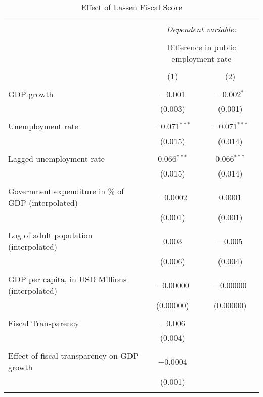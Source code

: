
\begin{table}[!htbp] \centering 
  \caption{Effect of Lassen Fiscal Score} 
  \label{} 
\begin{tabular}{@{\extracolsep{5pt}}lcc} 
\\[-1.8ex]\hline 
\hline \\[-1.8ex] 
 & \multicolumn{2}{c}{\textit{Dependent variable:}} \\ 
\cline{2-3} 
\\[-1.8ex] & \multicolumn{2}{c}{Difference in public employment rate} \\ 
\\[-1.8ex] & (1) & (2)\\ 
\hline \\[-1.8ex] 
 GDP growth & $-$0.001 & $-$0.002$^{*}$ \\ 
  & (0.003) & (0.001) \\ 
  & & \\ 
 Unemployment rate & $-$0.071$^{***}$ & $-$0.071$^{***}$ \\ 
  & (0.015) & (0.014) \\ 
  & & \\ 
 Lagged unemployment rate & 0.066$^{***}$ & 0.066$^{***}$ \\ 
  & (0.015) & (0.014) \\ 
  & & \\ 
 Government expenditure in \% of GDP (interpolated) & $-$0.0002 & 0.0001 \\ 
  & (0.001) & (0.001) \\ 
  & & \\ 
 Log of adult population (interpolated) & 0.003 & $-$0.005 \\ 
  & (0.006) & (0.004) \\ 
  & & \\ 
 GDP per capita, in USD Millions (interpolated) & $-$0.00000 & $-$0.00000 \\ 
  & (0.00000) & (0.00000) \\ 
  & & \\ 
 Fiscal Transparency & $-$0.006 &  \\ 
  & (0.004) &  \\ 
  & & \\ 
 Effect of fiscal transparency on GDP growth & $-$0.0004 &  \\ 
  & (0.001) &  \\ 
  & & \\ 

\end{tabular}
\end{table}
